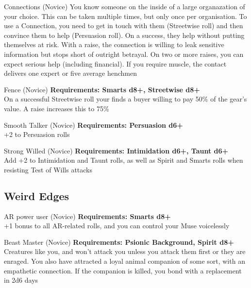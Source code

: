\begin{multicols}{2}
\begin{genericsection}{Connections (Novice)}
You know someone on the inside of a large organazation of your choice. This can be taken multiple times, but only once per organisation. To use a Connection, you need to get in touch with them (Streetwise roll) and then convince them to help (Persuasion roll). On a success, they help without putting themselves at risk. With a raise, the connection is willing to leak sensitive information but stops short of outright betrayal. On two or more raises, you can expect serious help (including financial). If you require muscle, the contact delivers one expert or five average henchmen
\end{genericsection}

\begin{genericsection}{Fence (Novice)}
\textbf{Requirements: Smarts d8+, Streetwise d8+}\\
On a successful Streetwise roll your finds a buyer willing to pay 50\% of the gear’s value. A
raise increases this to 75\%
\end{genericsection}
 
\begin{genericsection}{Smooth Talker (Novice)}
\textbf{Requirements: Persuasion d6+}\\
+2 to Persuasion rolls
\end{genericsection}

\begin{genericsection}{Strong Willed (Novice)}
\textbf{Requirements: Intimidation d6+, Taunt d6+}\\
Add +2 to Intimidation and Taunt rolls, as well as Spirit and Smarts rolls when resisting Test of Wills attacks
\end{genericsection}

%
%
\subsection{Weird Edges}

\begin{genericsection}{AR power user (Novice)}
\textbf{Requirements: Smarts d8+}\\
+1 bonus to all AR-related rolls, and you can control your Muse voicelessly
\end{genericsection}

\begin{genericsection}{Beast Master (Novice)}
\textbf{Requirements: Psionic Background, Spirit d8+}\\
Creatures like you, and won't attack you unless you attack them first or they are enraged. You also have attracted a loyal animal companion of some sort, with an empathetic connection. If the companion is killed, you bond with a replacement in 2d6 days
\end{genericsection}


\end{multicols}
